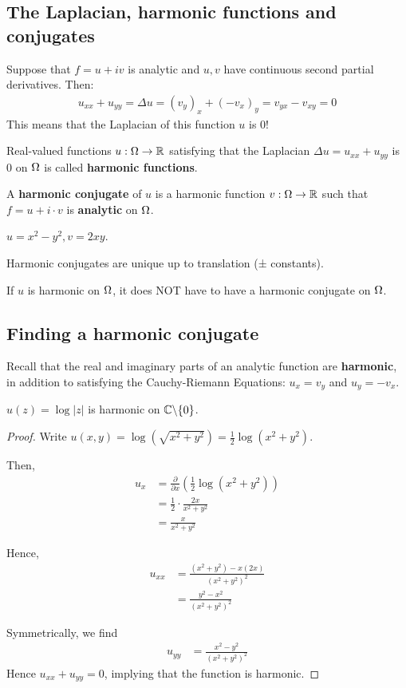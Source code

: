 \documentclass[12pt]{article}
\begin{document}
\subsection{The Laplacian, harmonic functions and conjugates}
Suppose that $f=u+iv$ is analytic and $u,v$ have continuous second partial derivatives. Then:\begin{align*}
    u_{xx}+u_{yy} = \Delta u = (v_y)_x + (-v_x)_y = v_{yx}-v_{xy}=0
\end{align*}
This means that the Laplacian of this function $u$ is 0!

 Real-valued functions $u: \Omega\to \mathbb{R}$ satisfying that the Laplacian $\Delta u= u_{xx}+u_{yy}$ is 0 on $\Omega$ is called \textbf{harmonic functions}.

 A \textbf{harmonic conjugate} of $u$ is a harmonic function $v: \Omega \to \mathbb{R}$ such that $f=u+i\cdot v$ is \textbf{analytic} on $\Omega$.

\eg $u=x^2-y^2, v=2xy$.

\rmk Harmonic conjugates are unique up to translation (± constants).

\rmk If $u$ is harmonic on $\Omega$, it does NOT have to have a harmonic conjugate on $\Omega$.

\subsection{Finding a harmonic conjugate}
Recall that the real and imaginary parts of an analytic function are \textbf{harmonic}, in addition to satisfying the Cauchy-Riemann Equations: $u_x=v_y$ and $u_y=-v_x$.

\eg $u(z)=\log |z|$ is harmonic on $\mathbb{C}\backslash\{0\}$.
\begin{proof}
    Write $u(x,y)=\log (\sqrt{x^2+y^2})=\frac{1}{2}\log(x^2+y^2)$.

    Then, \begin{align*}
        u_x&=\frac{\partial}{\partial x}\left(\frac{1}{2}\log (x^2+y^2)\right)\\
        &= \frac{1}{2}\cdot \frac{2x}{x^2+y^2}\\
        &= \frac{x}{x^2+y^2}
    \end{align*}

    Hence,
    \begin{align*}
        u_{xx} &= \frac{(x^2+y^2)-x(2x)}{(x^2+y^2)^2}\\
        &= \frac{y^2-x^2}{(x^2+y^2)^2}
    \end{align*}

    Symmetrically, we find \begin{align*}
        u_{yy} & = \frac{x^2-y^2}{(x^2+y^2)^2}
    \end{align*}
    Hence $u_{xx}+u_{yy}=0$, implying that the function is harmonic.
\end{proof}
\end{document}
